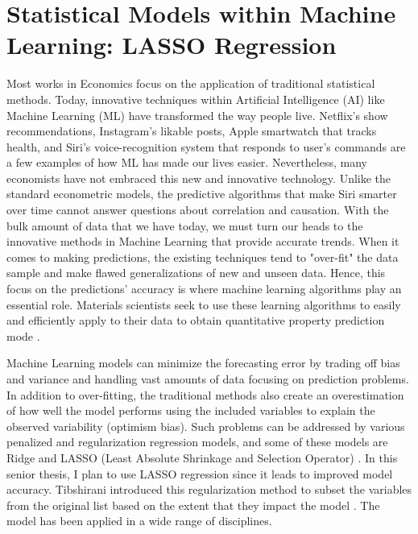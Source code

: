 \section{Statistical Models within Machine Learning: LASSO Regression}

\hspace{20pt}Most works in Economics focus on the application of traditional statistical methods. Today, innovative techniques within Artificial Intelligence (AI) like Machine Learning (ML) have transformed the way people live. Netflix's show recommendations, Instagram's likable posts, Apple smartwatch that tracks health, and Siri's voice-recognition system that responds to user's commands are a few examples of how ML has made our lives easier. Nevertheless, many economists have not embraced this new and innovative technology. Unlike the standard econometric models, the predictive algorithms that make Siri smarter over time cannot answer questions about correlation and causation. With the bulk amount of data that we have today, we must turn our heads to the innovative methods in Machine Learning that provide accurate trends. When it comes to making predictions, the existing techniques tend to "over-fit" the data sample and make flawed generalizations of new and unseen data. Hence, this focus on the predictions' accuracy is where machine learning algorithms play an essential role. Materials scientists seek to use these learning algorithms to easily and efficiently apply to their data to obtain quantitative property prediction mode \cite{mannodi2016critical}.

Machine Learning models can minimize the forecasting error by trading off bias and variance and handling vast amounts of data focusing on prediction problems. In addition to over-fitting, the traditional methods also create an overestimation of how well the model performs using the included variables to explain the observed variability (optimism bias). Such problems can be addressed by various penalized and regularization regression models, and some of these models are Ridge and LASSO (Least Absolute Shrinkage and Selection Operator) \cite{ranstam2018lasso}. In this senior thesis, I plan to use LASSO regression since it leads to improved model accuracy. Tibshirani introduced this regularization method to subset the variables from the original list based on the extent that they impact the model \cite{tibshirani1996regression}. The model has been applied in a wide range of disciplines.

